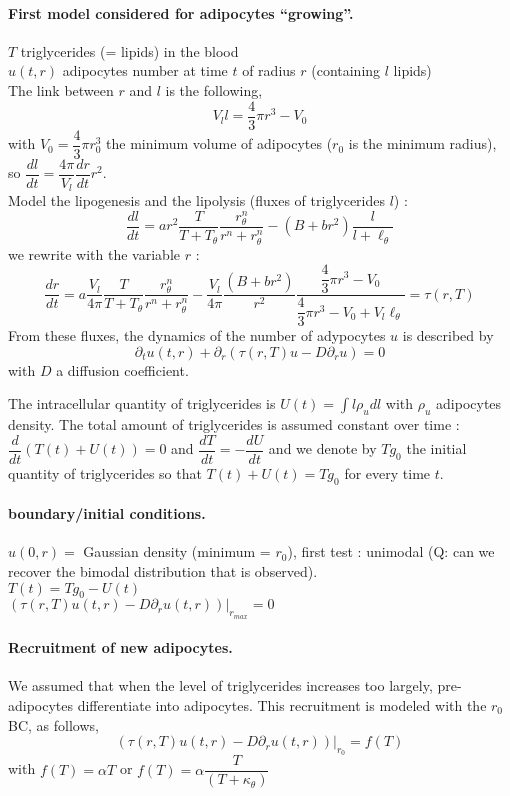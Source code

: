 \documentclass[11pt,a4paper]{article}
\begin{document}
\paragraph{First model considered for adipocytes ``growing''.\\}
$T$ triglycerides (= lipids)  in the blood\\
$u(t,r)$ adipocytes number at time $t$ of radius $r$ (containing $l$ lipids)  \\
The link between $r$ and $l$ is the following,
$$V_l l = \dfrac{4}{3} \pi r^3 - V_{0}$$
with $V_{0} = \dfrac{4}{3} \pi r_{0}^3$  the minimum volume of  adipocytes ($r_{0}$ is the minimum radius), so $\dfrac{dl}{dt} = \dfrac{4\pi}{V_{l}} \dfrac{dr}{dt} r^2$.\\

Model the lipogenesis and the lipolysis (fluxes of triglycerides $l$) : 
$$\dfrac{dl}{dt} = a r^2 \dfrac{T}{T + T_{\theta}} \dfrac{r_{\theta}^n}{r^n+r_{\theta}^n} - (B + br^2) \dfrac{l}{l + \ell_{\theta}}$$
we rewrite with the variable $r$ : 
$$\dfrac{dr}{dt} = a\dfrac{V_{l}}{4\pi} \dfrac{T}{T + T_{\theta}} \dfrac{r_{\theta}^n}{r^n+r_{\theta}^n}  - \dfrac{V_{l}}{4\pi}\dfrac{(B + br^2)}{r^2} \dfrac{\dfrac{4}{3} \pi r^3 - V_{0}}{\dfrac{4}{3} \pi r^3 - V_{0} +V_{l} \ell_{\theta}} = \tau(r, T)$$
From these fluxes, the dynamics of the number of adypocytes $u$ is described by 
$$\partial_t u(t, r) + \partial_r( \tau(r, T) u - D \partial_r u) = 0$$
with $D$ a diffusion coefficient.

The intracellular quantity of triglycerides is $U(t) = \displaystyle \int l \rho_u dl$ with $\rho_u$ adipocytes density. The total amount of triglycerides is assumed constant over time : $\dfrac{d}{dt}(T(t) + U(t)) = 0$ and $\dfrac{dT}{dt} = -\dfrac{dU}{dt}$ and we denote by $Tg_{0}$ the initial quantity of triglycerides so that $T(t) + U(t)=Tg_{0}$ for every time $t$.
 
\paragraph{boundary/initial conditions.}
$u(0, r) =$ Gaussian density (minimum = $r_{0}$), first test : unimodal (Q: can we recover the bimodal distribution that is observed).\\
$T(t) = Tg_{0}- U(t)$\\
$(\tau(r, T) u(t,r) - D \partial_r u(t,r)) |_{r_{max}}=0$
\paragraph{Recruitment of new adipocytes.} We assumed that when the level of triglycerides increases too largely, pre-adipocytes differentiate into adipocytes. This recruitment is modeled with the $r_{0}$ BC, as follows,
$$(\tau(r, T) u(t,r) - D \partial_r u(t,r)) |_{r_{0}}= f(T)$$ with $f(T) = \alpha T$ or $f(T) = \alpha \dfrac{T}{(T+\kappa_{\theta})}$ 
\end{document}
